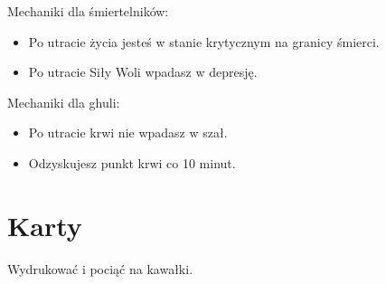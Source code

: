 	Mechaniki dla śmiertelników:
	\begin{itemize}
		\item Po utracie życia jesteś w stanie krytycznym na granicy śmierci.
		\item Po utracie Siły Woli wpadasz w depresję.
	\end{itemize}

	Mechaniki dla ghuli:
	\begin{itemize}
		\item Po utracie krwi nie wpadasz w szał.
		\item Odzyskujesz punkt krwi co 10 minut.
	\end{itemize}


	
		
\section{Karty}
	Wydrukować i pociąć na kawałki.
